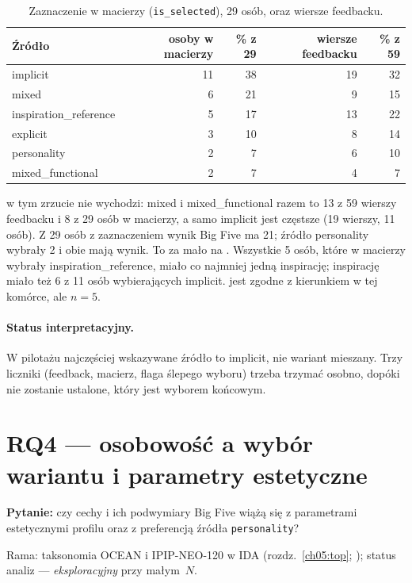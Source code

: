 \begin{table}[htbp]
  \centering
  \small
  \caption{Zaznaczenie w macierzy (\texttt{is\_selected}), 29 osób, oraz wiersze feedbacku.}
  \label{tab:ch08:sources}
  \begin{tabular}{lrrrr}
    \toprule
    Źródło & osoby w macierzy & \% z 29 & wiersze feedbacku & \% z 59 \\
    \midrule
    implicit & 11 & 38 & 19 & 32 \\
    mixed & 6 & 21 & 9 & 15 \\
    inspiration\_reference & 5 & 17 & 13 & 22 \\
    explicit & 3 & 10 & 8 & 14 \\
    personality & 2 & 7 & 6 & 10 \\
    mixed\_functional & 2 & 7 & 4 & 7 \\
    \bottomrule
  \end{tabular}
\end{table}

\noindent
{} w tym zrzucie nie wychodzi: mixed i mixed\_functional razem to 13 z 59 wierszy feedbacku i 8 z 29 osób w macierzy, a samo implicit jest częstsze (19 wierszy, 11 osób).
Z 29 osób z zaznaczeniem wynik Big Five ma 21; źródło personality wybrały 2 i obie mają wynik. To za mało na .
Wszystkie 5 osób, które w macierzy wybrały inspiration\_reference, miało co najmniej jedną inspirację; inspirację miało też 6 z 11 osób wybierających implicit.  jest zgodne z kierunkiem w tej komórce, ale $n=5$.

\paragraph{Status interpretacyjny.}
W pilotażu najczęściej wskazywane źródło to implicit, nie wariant mieszany. Trzy liczniki (feedback, macierz, flaga ślepego wyboru) trzeba trzymać osobno, dopóki nie zostanie ustalone, który jest wyborem końcowym.

\section{RQ4 --- osobowość a wybór wariantu i parametry estetyczne}
\label{ch08:sec:rq4}
\label{ch08:sec:personality}

\textbf{Pytanie:} czy cechy i ich podwymiary Big Five wiążą się z parametrami estetycznymi profilu oraz z preferencją źródła \texttt{personality}?

Rama: taksonomia OCEAN i IPIP-NEO-120 w IDA (rozdz.~\ref{ch05:top}; \cite{john2008bigfive}); status analiz --- \emph{eksploracyjny} przy małym~$N$.


